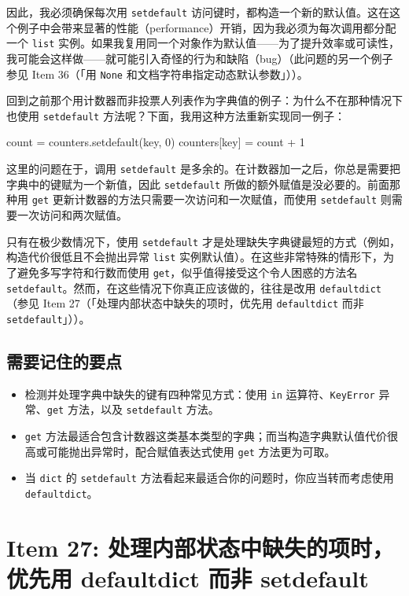 因此，我必须确保每次用 \texttt{setdefault} 访问键时，都构造一个新的默认值。这在这个例子中会带来显著的性能（performance）开销，因为我必须为每次调用都分配一个 \texttt{list} 实例。如果我复用同一个对象作为默认值——为了提升效率或可读性，我可能会这样做——就可能引入奇怪的行为和缺陷（bug）（此问题的另一个例子参见 Item 36（「用 \texttt{None} 和文档字符串指定动态默认参数」））。

回到之前那个用计数器而非投票人列表作为字典值的例子：为什么不在那种情况下也使用 \texttt{setdefault} 方法呢？下面，我用这种方法重新实现同一例子：

\begin{codebox}[python]
count = counters.setdefault(key, 0)
counters[key] = count + 1
\end{codebox}

这里的问题在于，调用 \texttt{setdefault} 是多余的。在计数器加一之后，你总是需要把字典中的键赋为一个新值，因此 \texttt{setdefault} 所做的额外赋值是没必要的。前面那种用 \texttt{get} 更新计数器的方法只需要一次访问和一次赋值，而使用 \texttt{setdefault} 则需要一次访问和两次赋值。

只有在极少数情况下，使用 \texttt{setdefault} 才是处理缺失字典键最短的方式（例如，构造代价很低且不会抛出异常 \texttt{list} 实例默认值）。在这些非常特殊的情形下，为了避免多写字符和行数而使用 \texttt{get}，似乎值得接受这个令人困惑的方法名 \texttt{setdefault}。然而，在这些情况下你真正应该做的，往往是改用 \texttt{defaultdict}（参见 Item 27（「处理内部状态中缺失的项时，优先用 \texttt{defaultdict} 而非 \texttt{setdefault}」））。

\subsection{需要记住的要点}

\begin{itemize}
\item 检测并处理字典中缺失的键有四种常见方式：使用 \texttt{in} 运算符、\texttt{KeyError} 异常、\texttt{get} 方法，以及 \texttt{setdefault} 方法。
\item \texttt{get} 方法最适合包含计数器这类基本类型的字典；而当构造字典默认值代价很高或可能抛出异常时，配合赋值表达式使用 \texttt{get} 方法更为可取。
\item 当 \texttt{dict} 的 \texttt{setdefault} 方法看起来最适合你的问题时，你应当转而考虑使用 \texttt{defaultdict}。
\end{itemize}

\section{Item 27: 处理内部状态中缺失的项时，优先用 defaultdict 而非 setdefault}

